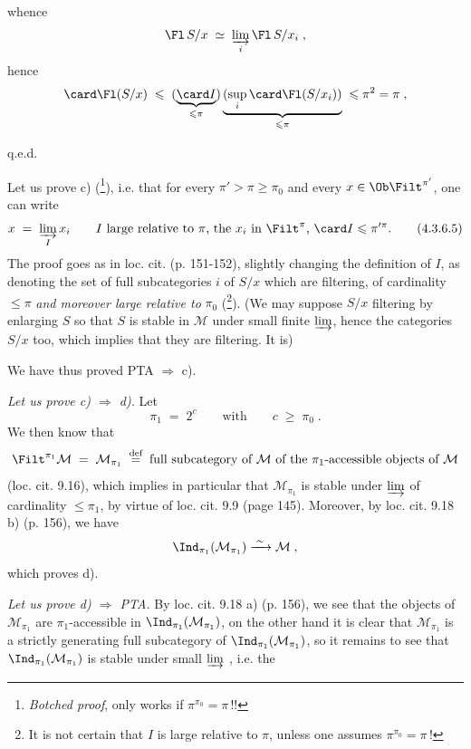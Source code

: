 \setcounter{footnote}{11}


whence
\[
\Fl\,S/x \;\simeq\; \varinjlim_{i} \Fl\,S/x_i \;,
\]
hence
\[
\card\Fl(S/x) \;\leqslant\; (\underbrace{\card I}_{\leqslant\pi})\underbrace{(\sup_{i}\card\Fl(S/x_i))}_{\leqslant\pi} \;\leqslant \pi^2 = \pi \;,
\]

\hfill q.e.d.

Let us prove c) (\footnote{\textit{Botched proof}, only works if $\pi^{\pi_0} = \pi$\,!!}), i.e. that for every $\pi' > \pi \geqslant \pi_0$ and every $x \in \Ob\Filt^{\pi'}$, one can write
\[
x \;=\; \varinjlim_{I} x_i \qquad I \text{ large relative to } \pi\text{, the } x_i \text{ in } \Filt^{\pi}\text{, } \card I \leqslant \pi'^{\pi}. \tag*{(4.3.6.5)}
\]
The proof goes as in loc. cit. (p. 151-152), slightly changing the definition of $I$, as denoting the set of full subcategories $i$ of $S/x$ which are filtering, of cardinality $\leqslant \pi$ \textit{and moreover large relative to} $\pi_0$ (\footnote{It is not certain that $I$ is large relative to $\pi$, unless one assumes $\pi^{\pi_0} = \pi$\,!}). (We may suppose $S/x$ filtering by enlarging $S$ so that $S$ is stable in $\mathcal{M}$ under small finite $\varinjlim$, hence the categories $S/x$ too, which implies that they are filtering. It is)

We have thus proved PTA $\Longrightarrow$ c).

\textit{Let us prove c) $\Longrightarrow$ d).} Let
\[
\pi_1 \;=\; 2^c \qquad \text{with} \qquad c \;\geqslant\; \pi_0 \;.
\]
We then know that
\[
\Filt^{\pi_1}\mathcal{M} \;=\; \mathcal{M}_{\pi_1} \;\overset{\text{def}}{=}\; \text{full subcategory of $\mathcal{M}$ of the $\pi_1$-accessible objects of $\mathcal{M}$}
\]
(loc. cit. 9.16), which implies in particular that $\mathcal{M}_{\pi_1}$ is stable under $\varinjlim$ of cardinality $\leqslant \pi_1$, by virtue of loc. cit. 9.9 (page 145). Moreover,
by loc. cit. 9.18 b) (p. 156), we have
\[
\Ind_{\pi_1}(\mathcal{M}_{\pi_1}) \xrightarrow{\;\sim\;} \mathcal{M} \;,
\]
which proves d).

\textit{Let us prove d) $\Longrightarrow$ PTA.} By loc. cit. 9.18 a) (p. 156), we see that the objects of $\mathcal{M}_{\pi_1}$ are $\pi_1$-accessible in $\Ind_{\pi_1}(\mathcal{M}_{\pi_1})$, on the other hand it is clear that $\mathcal{M}_{\pi_1}$ is a strictly generating full subcategory of $\Ind_{\pi_1}(\mathcal{M}_{\pi_1})$, so it remains to see that $\Ind_{\pi_1}(\mathcal{M}_{\pi_1})$ is stable under small $\varinjlim$ , i.e. the

